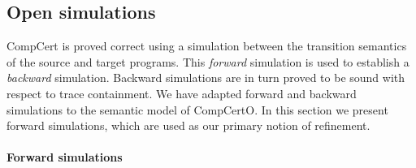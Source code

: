 \documentclass[sigplan,screen]{acmart}
\begin{document}

\subsection{Open simulations} \label{sec:sem:ref} %

CompCert is proved correct using a simulation
between the transition semantics of the source and target programs.
This \emph{forward}
simulation is used to establish a \emph{backward} simulation.
Backward simulations
are in turn proved to be sound with respect to trace containment.
We have adapted forward and backward simulations to
the semantic model of CompCertO.
In this section we present forward simulations,
which are
used as our primary notion of refinement.

\paragraph{Forward simulations} %
\end{document}
